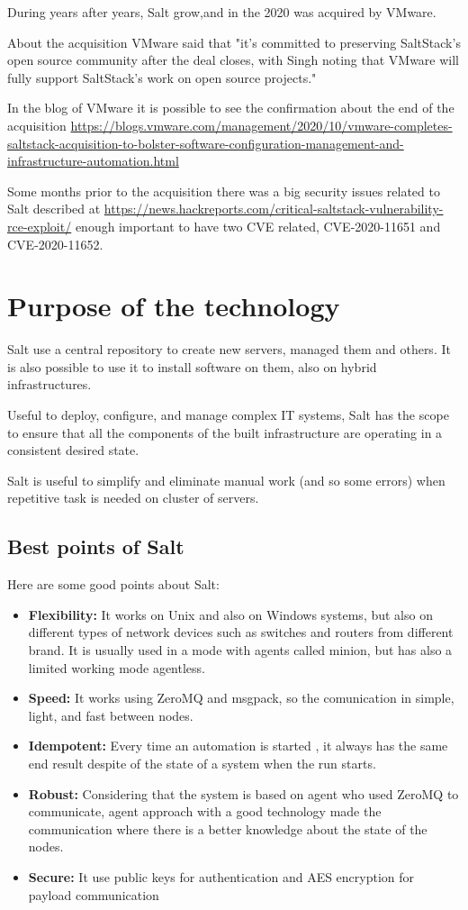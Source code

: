 \documentclass[12pt,a4paper,openright,twoside]{book}
\begin{document}
During years after years, Salt grow,and in the 2020 was acquired by VMware.


About the acquisition VMware said that "it's committed to preserving SaltStack's open source community after the deal closes, with Singh noting that VMware will fully support SaltStack's work on open source projects."\cite{saltAcq}


In the blog of VMware it is possible to see the confirmation about the end of the acquisition
\url{https://blogs.vmware.com/management/2020/10/vmware-completes-saltstack-acquisition-to-bolster-software-configuration-management-and-infrastructure-automation.html}

Some months prior to the acquisition there was a big security issues related to Salt described at \url{https://news.hackreports.com/critical-saltstack-vulnerability-rce-exploit/} enough important to have two CVE related, CVE-2020-11651 and CVE-2020-11652.

\section{Purpose of the technology}
Salt use a central repository to create new servers, managed them and others. It is also possible to use it to install software on them, also on hybrid infrastructures.


Useful to deploy, configure, and manage complex IT systems, Salt has the scope to ensure that all the components of the built infrastructure are operating in a consistent desired state.


Salt is useful to simplify and eliminate manual work (and so some errors) when repetitive task is needed on cluster of servers.

\subsection{Best points of Salt}

Here are some good points about Salt:
\begin{itemize}
    \item \textbf{Flexibility:} It works on Unix and also on Windows systems, but also on different types of network devices such as switches and routers from different brand.
                                It is usually used in a mode with agents called minion, but has also a limited working mode agentless.
    \item \textbf{Speed:} It works using ZeroMQ and msgpack, so the comunication in simple, light, and fast between nodes.
    \item \textbf{Idempotent:} Every time an automation is started , it always has the same end result despite of the state of a system when the run starts.
    \item \textbf{Robust:} Considering that the system is based on agent who used ZeroMQ to communicate, agent approach with a good technology made the communication where there is a better knowledge about the state of the nodes.
    \item \textbf{Secure:} It use public keys for authentication and AES encryption for payload communication
\end{itemize}
\end{document}
